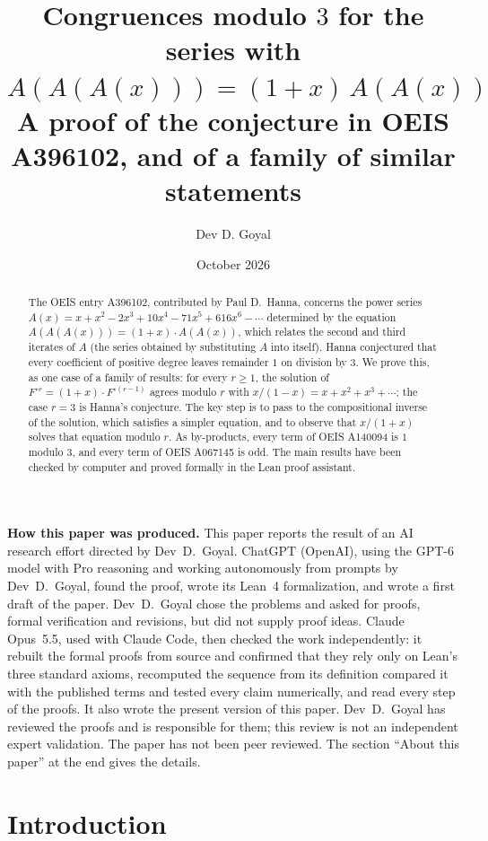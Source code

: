 \documentclass[11pt,a4paper]{article}
\title{Congruences modulo $3$ for the series with $A(A(A(x)))=(1+x)\,A(A(x))$\\[6pt]\large A proof of the conjecture in OEIS A396102, and of a family of similar statements}
\author{Dev D. Goyal}
\date{October 2026}
\theoremstyle{definition}
\theoremstyle{remark}
\begin{document}
\maketitle
\begin{abstract}
The OEIS entry A396102, contributed by Paul D.~Hanna, concerns the power series
$A(x)=x+x^2-2x^3+10x^4-71x^5+616x^6-\cdots$ determined by the equation $A(A(A(x)))=(1+x)\cdot A(A(x))$, which relates
the second and third iterates of $A$ (the series obtained by substituting $A$ into itself). Hanna conjectured that
every coefficient of positive degree leaves remainder $1$ on division by $3$. We prove this, as one case of a family of results: for every
$r\ge1$, the solution of $F^{\circ r}=(1+x)\cdot F^{\circ(r-1)}$ agrees modulo $r$ with $x/(1-x)=x+x^2+x^3+\cdots$; the
case $r=3$ is Hanna's conjecture. The key step is to pass to the compositional inverse of the solution, which satisfies
a simpler equation, and to observe that $x/(1+x)$ solves that equation modulo $r$. As by-products, every term of OEIS
A140094 is $1$ modulo $3$, and every term of OEIS A067145 is odd. The main results have been checked by computer and
proved formally in the Lean proof assistant.
\end{abstract}
\begin{center}\begin{minipage}{0.88\linewidth}\small
\textbf{How this paper was produced.} This paper reports the result of an AI research effort directed by
Dev~D.~Goyal. ChatGPT (OpenAI), using the GPT-6 model with Pro reasoning and working autonomously from prompts by
Dev~D.~Goyal, found the proof, wrote its Lean~4 formalization, and wrote a first draft of the paper.
Dev~D.~Goyal chose the problems and asked for proofs, formal verification and revisions, but did not supply proof
ideas. Claude Opus~5.5, used with Claude Code, then checked the work independently: it rebuilt the formal proofs from
source and confirmed that they rely only on Lean's three standard axioms, recomputed the sequence from its definition
compared it with the published terms and tested every claim numerically, and read every step of the proofs. It also wrote the present
version of this paper.
Dev~D.~Goyal has reviewed the proofs and is responsible for them; this review is not an independent expert validation.
The paper has not been peer reviewed.
The section ``About this paper'' at the end gives the details.
\end{minipage}\end{center}

\section{Introduction}
\end{document}
